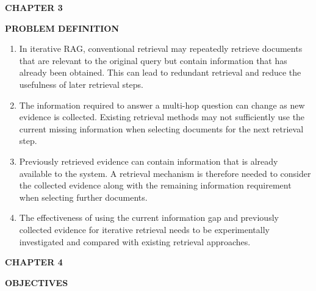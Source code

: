 \documentclass[12pt,a4paper]{report}
\newcommand{\chaptertitle}[2]{
    \begin{center}
        {\fontsize{18}{21}\selectfont\bfseries CHAPTER #1\par}
        \vspace{0.10in}
        {\fontsize{18}{21}\selectfont\bfseries #2\par}
    \end{center}
    \vspace{0.12in}
}
\begin{document}
\clearpage


\normalsize



\chaptertitle{3}{PROBLEM DEFINITION}

\justifying

\begin{enumerate}[
    leftmargin=0.30in,
    itemsep=0.12in,
    parsep=0pt
]

\item
In iterative RAG, conventional retrieval may repeatedly retrieve documents that are relevant to the original query but contain information that has already been obtained. This can lead to redundant retrieval and reduce the usefulness of later retrieval steps.

\item
The information required to answer a multi-hop question can change as new evidence is collected. Existing retrieval methods may not sufficiently use the current missing information when selecting documents for the next retrieval step.

\item
Previously retrieved evidence can contain information that is already available to the system. A retrieval mechanism is therefore needed to consider the collected evidence along with the remaining information requirement when selecting further documents.

\item
The effectiveness of using the current information gap and previously collected evidence for iterative retrieval needs to be experimentally investigated and compared with existing retrieval approaches.

\end{enumerate}

\clearpage



\chaptertitle{4}{OBJECTIVES}
\end{document}
